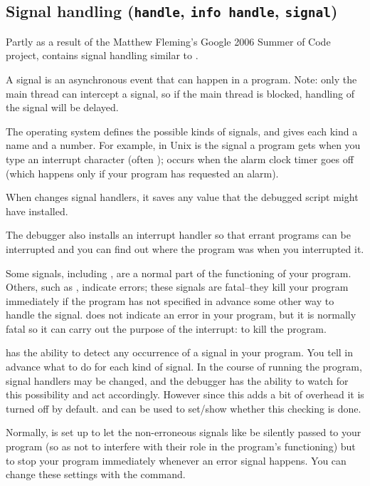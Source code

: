 \subsection{Signal handling ({\tt handle}, {\tt info handle}, {\tt signal})\label{subsection-signal}}

Partly as a result of the Matthew Fleming's Google 2006 Summer of Code
project,  contains signal handling similar to .

A signal is an asynchronous event that can happen in a program.  Note:
only the main thread can intercept a signal, so if the main thread is
blocked, handling of the signal will be delayed.

The operating system defines the possible kinds of signals, and gives
each kind a name and a number.  For example, in Unix  is
the signal a program gets when you type an interrupt character (often
);  occurs when the alarm clock timer goes off
(which happens only if your program has requested an alarm).

When  changes signal handlers, it saves any value that the
debugged script might have installed. 

The debugger also installs an interrupt handler  so that
errant programs can be interrupted and you can find out where the
program was when you interrupted it.

Some signals, including , are a normal part of the
functioning of your program.  Others, such as , indicate
errors; these signals are fatal--they kill your program immediately if the
program has not specified in advance some other way to handle the signal.
 does not indicate an error in your program, but it is normally
fatal so it can carry out the purpose of the interrupt: to kill the program.

 has the ability to detect any occurrence of a signal in
your program.  You tell  in advance what to do for each
kind of signal.  In the course of running the program, signal handlers
may be changed, and the debugger has the ability to watch for this
possibility and act accordingly. However since this adds a bit of
overhead it is turned off by default.  and
 can be used to set/show whether this checking is
done.

Normally,  is set up to let the non-erroneous signals like
 be silently passed to your program (so as not to
interfere with their role in the program's functioning) but to stop
your program immediately whenever an error signal happens.  You can
change these settings with the  command.


